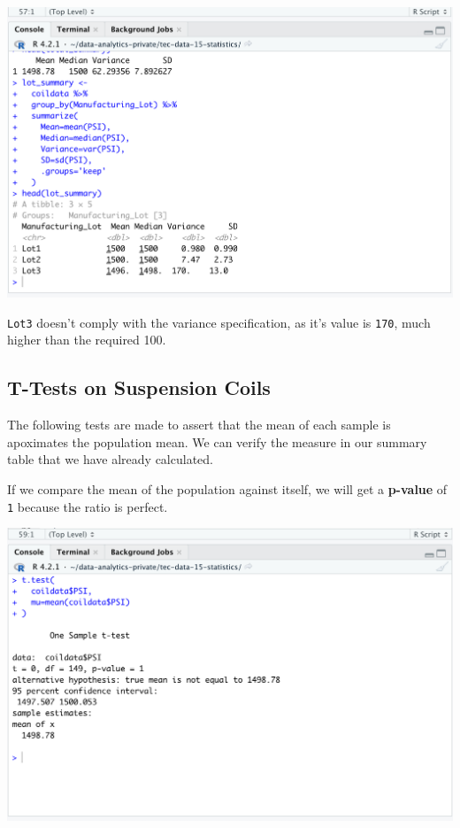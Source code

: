 \documentclass[11pt]{article}
\begin{document}
\begin{center}
\includegraphics[width=.9\linewidth]{./resources/_r_2b.png}
\end{center}

\texttt{Lot3} doesn't comply with the variance specification, as it's value is \texttt{170}, much higher than the required 100.


\subsection{T-Tests on Suspension Coils}
\label{sec:orgf43d608}

The following tests are made to assert that the mean of each sample is apoximates the population mean. We can verify the measure in our summary table that we have already calculated.

If we compare the mean of the population against itself, we will get a \textbf{p-value} of \texttt{1} because the ratio is perfect.

\begin{center}
\includegraphics[width=.9\linewidth]{./resources/_r_3a.png}
\end{center}
\end{document}
